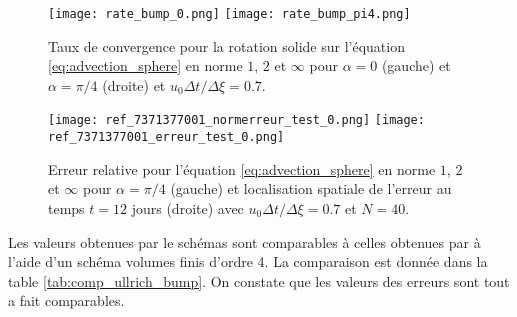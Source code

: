 \begin{figure}[htbp]
\begin{center}
\texttt{[image: rate\_bump\_0.png]}
\texttt{[image: rate\_bump\_pi4.png]}
\end{center}
\caption{Taux de convergence pour la rotation solide sur l'équation \eqref{eq:advection_sphere} en norme $1$, $2$ et $\infty$ pour $\alpha = 0$ (gauche) et $\alpha = \pi / 4$ (droite) et $u_0 \Delta t / \Delta \xi = 0.7$.}
\label{fig:rate_bump}
\end{figure}

\begin{figure}[htbp]
\begin{center}
\texttt{[image: ref\_7371377001\_normerreur\_test\_0.png]}
\texttt{[image: ref\_7371377001\_erreur\_test\_0.png]}
\end{center}
\caption{Erreur relative pour l'équation \eqref{eq:advection_sphere} en norme $1$, $2$ et $\infty$ pour $\alpha = \pi/4$ (gauche) et localisation spatiale de l'erreur au temps $t=12$ jours (droite) avec $u_0 \Delta t / \Delta \xi = 0.7$ et $N=40$.}
\label{fig:erreur_bump}
\end{figure}

Les valeurs obtenues par le schémas sont comparables à celles obtenues par \cite{Ullrich2010, Ullrich2011} à l'aide d'un schéma volumes finis d'ordre 4. La comparaison est donnée dans la table \ref{tab:comp_ullrich_bump}. On constate que les valeurs des erreurs sont tout a fait comparables.

